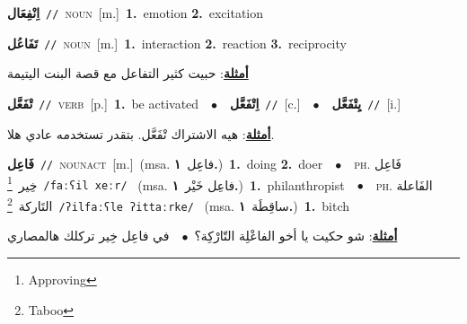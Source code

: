 \documentclass[10pt,a4paper,twoside]{article} %
\begin{document}
\begin{multicols}{2}
{\setlength\topsep{0pt}\textbf{\foreignlanguage{arabic}{اِنْفِعَال}}\ {\color{gray}\texttt{//}\color{black}}\ \textsc{noun}\ [m.]\ \textbf{1.}~emotion  \textbf{2.}~excitation\ } \vspace{2mm}

{\setlength\topsep{0pt}\textbf{\foreignlanguage{arabic}{تَفَاعُل}}\ {\color{gray}\texttt{//}\color{black}}\ \textsc{noun}\ [m.]\ \textbf{1.}~interaction  \textbf{2.}~reaction  \textbf{3.}~reciprocity\  \begin{flushright}\color{gray}\foreignlanguage{arabic}{\textbf{\underline{\foreignlanguage{arabic}{أمثلة}}}: حبيت كثير التفاعل مع قصة البنت اليتيمة}\end{flushright}\color{black}} \vspace{2mm}

{\setlength\topsep{0pt}\textbf{\foreignlanguage{arabic}{تْفَعَّل}}\ {\color{gray}\texttt{//}\color{black}}\ \textsc{verb}\ [p.]\ \textbf{1.}~be activated\ \ $\bullet$\ \ \setlength\topsep{0pt}\textbf{\foreignlanguage{arabic}{اِتْفَعَّل}}\ {\color{gray}\texttt{//}\color{black}}\ [c.]\ \ $\bullet$\ \ \setlength\topsep{0pt}\textbf{\foreignlanguage{arabic}{يِتْفَعَّل}}\ {\color{gray}\texttt{//}\color{black}}\ [i.]\  \begin{flushright}\color{gray}\foreignlanguage{arabic}{\textbf{\underline{\foreignlanguage{arabic}{أمثلة}}}: هيه الاشتراك تْفَعَّل. بتقدر تستخدمه عادي هلا.}\end{flushright}\color{black}} \vspace{2mm}

{\setlength\topsep{0pt}\textbf{\foreignlanguage{arabic}{فَاعِل}}\ {\color{gray}\texttt{//}\color{black}}\ \textsc{noun\textunderscore act}\ [m.]\ \color{gray}(msa. \foreignlanguage{arabic}{فاعِل}~\foreignlanguage{arabic}{\textbf{١.}})\color{black}\ \textbf{1.}~doing  \textbf{2.}~doer\ \ $\bullet$\ \ \textsc{ph.} \color{gray} \foreignlanguage{arabic}{فَاعِل خِير}\color{black}\ \footnote{Approving}\ {\color{gray}\texttt{/{\sffamily faːʕil xeːr}/}\color{black}}\ \color{gray} (msa. \foreignlanguage{arabic}{فاعِل خَيْر}~\foreignlanguage{arabic}{\textbf{١.}})\color{black}\ \textbf{1.}~philanthropist\ \ $\bullet$\ \ \textsc{ph.} \color{gray} \foreignlanguage{arabic}{الفَاعلة التَاركة}\color{black}\ \footnote{Taboo}\ {\color{gray}\texttt{/{\sffamily ʔilfaːʕle ʔittaːrke}/}\color{black}}\ \color{gray} (msa. \foreignlanguage{arabic}{ساقِطَة}~\foreignlanguage{arabic}{\textbf{١.}})\color{black}\ \textbf{1.}~bitch\  \begin{flushright}\color{gray}\foreignlanguage{arabic}{\textbf{\underline{\foreignlanguage{arabic}{أمثلة}}}: شو حكيت يا أخو الفاعْلِة التّارْكِة؟\ $\bullet$\ \  في فاعِل خِير تركلك هالمصاري}\end{flushright}\color{black}} \vspace{2mm}


\end{multicols}
\end{document}
